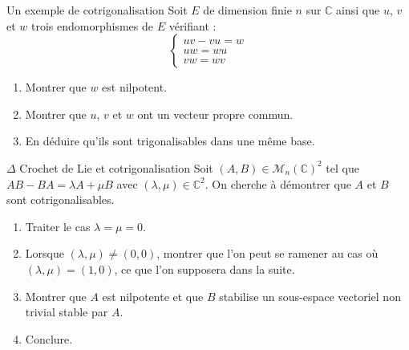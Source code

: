 \documentclass[french,a4paper]{article}
\newcommand{\C}{\mathbb{C}}
\theoremstyle{plain}
\theoremstyle{definition}
\theoremstyle{remark}
\begin{document}
\begin{ex}[Châteaux]{Un exemple de cotrigonalisation}
	Soit $E$ de dimension finie $n$ sur $\C$ ainsi que $u$, $v$ et $w$ trois endomorphismes de $E$ vérifiant : $$\begin{cases}
		uv-vu=w\\
		uw=wu\\
		vw=wv
	\end{cases}$$
	\begin{enumerate}
		\item Montrer que $w$ est nilpotent.
		\item Montrer que $u$, $v$ et $w$ ont un vecteur propre commun.
		\item En déduire qu'ils sont trigonalisables dans une même base.
	\end{enumerate}
\end{ex}
\begin{ex}{$\Delta$ Crochet de Lie et cotrigonalisation}
	Soit $(A,B)\in\mathcal{M}_n(\C)^2$ tel que $AB-BA=\lambda A+\mu B$ avec $(\lambda,\mu)\in\C^2$. On cherche à démontrer que $A$ et $B$ sont cotrigonalisables.
	\begin{enumerate}
		\item Traiter le cas $\lambda=\mu=0$.
		\item Lorsque $(\lambda,\mu)\ne(0,0)$, montrer que l'on peut se ramener au cas où $(\lambda,\mu)=(1,0)$, ce que l'on supposera dans la suite.
		\item Montrer que $A$ est nilpotente et que $B$ stabilise un sous-espace vectoriel non trivial stable par $A$.
		\item Conclure.
	\end{enumerate}
\end{ex}
\end{document}
